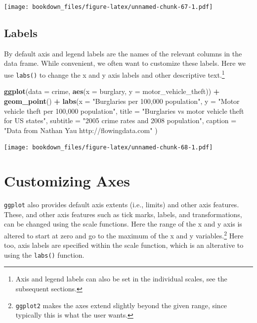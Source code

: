 \documentclass[]{krantz}
\makeatletter
\newenvironment{Shaded}{\begin{snugshade}}{\end{snugshade}}
\newcommand{\KeywordTok}[1]{\textcolor[rgb]{0.27,0.27,0.27}{\textbf{#1}}}
\newcommand{\DataTypeTok}[1]{\textcolor[rgb]{0.27,0.27,0.27}{#1}}
\newcommand{\StringTok}[1]{\textcolor[rgb]{0.5,0.5,0.5}{#1}}
\newcommand{\OperatorTok}[1]{\textcolor[rgb]{0.43,0.43,0.43}{\textbf{#1}}}
\newcommand{\NormalTok}[1]{#1}
\newenvironment{kframe}{%
\medskip{}
\setlength{\fboxsep}{.8em}
 \def\at@end@of@kframe{}%
 \ifinner\ifhmode%
  \def\at@end@of@kframe{\end{minipage}}%
  \begin{minipage}{\columnwidth}%
 \fi\fi%
 \def\FrameCommand##1{\hskip\@totalleftmargin \hskip-\fboxsep
 \colorbox{shadecolor}{##1}\hskip-\fboxsep
     \hskip-\linewidth \hskip-\@totalleftmargin \hskip\columnwidth}%
 \MakeFramed {\advance\hsize-\width
   \@totalleftmargin\z@ \linewidth\hsize
   \@setminipage}}%
 {\par\unskip\endMakeFramed%
 \at@end@of@kframe}
\renewenvironment{Shaded}{\begin{kframe}}{\end{kframe}}
\makeatother
\begin{document}
\texttt{[image: bookdown\_files/figure-latex/unnamed-chunk-67-1.pdf]}

\subsection{Labels}\label{labels}

By default axis and legend labels are the names of the relevant columns
in the data frame. While convenient, we often want to customize these
labels. Here we use \texttt{labs()} to change the x and y axis labels
and other descriptive text.\footnote{Axis and legend labels can also be
  set in the individual scales, see the subsequent sections.}

\begin{Shaded}
\begin{Highlighting}[]
\KeywordTok{ggplot}\NormalTok{(}\DataTypeTok{data =}\NormalTok{ crime, }\KeywordTok{aes}\NormalTok{(}\DataTypeTok{x =}\NormalTok{ burglary, }\DataTypeTok{y =}\NormalTok{ motor_vehicle_theft)) }\OperatorTok{+}\StringTok{ }
\StringTok{    }\KeywordTok{geom_point}\NormalTok{() }\OperatorTok{+}\StringTok{ }
\StringTok{    }\KeywordTok{labs}\NormalTok{(}\DataTypeTok{x =} \StringTok{"Burglaries per 100,000 population"}\NormalTok{, }
         \DataTypeTok{y =} \StringTok{"Motor vehicle theft per 100,000 population"}\NormalTok{,}
         \DataTypeTok{title =} \StringTok{"Burglaries vs motor vehicle theft for US states"}\NormalTok{,}
         \DataTypeTok{subtitle =} \StringTok{"2005 crime rates and 2008 population"}\NormalTok{,}
         \DataTypeTok{caption =} \StringTok{"Data from Nathan Yau http://flowingdata.com"}
\NormalTok{         )}
\end{Highlighting}
\end{Shaded}

\texttt{[image: bookdown\_files/figure-latex/unnamed-chunk-68-1.pdf]}

\section{Customizing Axes}\label{customizing-axes}

\texttt{ggplot} also provides default axis extents (i.e., limits) and
other axis features. These, and other axis features such as tick marks,
labels, and transformations, can be changed using the scale functions.
Here the range of the x and y axis is altered to start at zero and go to
the maximum of the x and y variables.\footnote{\texttt{ggplot2} makes
  the axes extend slightly beyond the given range, since typically this
  is what the user wants.} Here too, axis labels are specified within
the scale function, which is an alterative to using the \texttt{labs()}
function.
\end{document}
